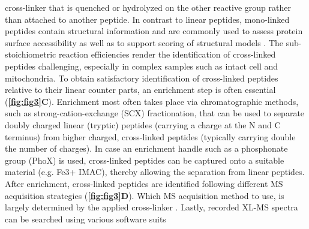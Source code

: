 cross-linker that is quenched or hydrolyzed on the other reactive group rather than attached to another peptide. In contrast to linear peptides, mono-linked peptides contain structural information and are commonly used to assess protein surface accessibility as well as to support scoring of structural models \cite{Sinnott_2020}. The sub-stoichiometric reaction efficiencies render the identification of cross-linked peptides challenging, especially in complex samples such as intact cell and mitochondria. To obtain satisfactory identification of cross-linked peptides relative to their linear counter parts, an enrichment step is often essential (\textbf{\autoref{fig:fig3}C}). Enrichment most often takes place via chromatographic methods, such as strong-cation-exchange (SCX) fractionation, that can be used to separate doubly charged linear (tryptic) peptides (carrying a charge at the N and C terminus) from higher charged, cross-linked peptides (typically carrying double the number of charges). In case an enrichment handle such as a phosphonate group (PhoX) is used, cross-linked peptides can be captured onto a suitable material (e.g. Fe3+ IMAC), thereby allowing the separation from linear peptides. After enrichment, cross-linked peptides are identified following different MS acquisition strategies (\textbf{\autoref{fig:fig3}D}). Which MS acquisition method to use, is largely determined by the applied cross-linker \cite{Liu_2017a}. Lastly, recorded XL-MS spectra can be searched using various software suits \clearpage

